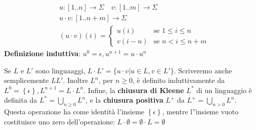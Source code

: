 \documentclass[12pt, a4paper]{report}
\begin{document}
            \begin{definition}[Concatenazione]
                \begin{equation*}
                    \begin{split}
                        &u:\left[1..n\right]\rightarrow \Sigma \quad v:\left[1..m\right]\rightarrow \Sigma\\
                        &u\cdot v:\left[1..n+m\right] \rightarrow \Sigma \\
                        &(u\cdot v)(i) = \begin{cases}
                            u(i) & \text{se } 1\leq i \leq n\\
                            v(i-n) & \text{se } n < i \leq n+m
                        \end{cases}
                    \end{split}
                \end{equation*}
                \textbf{Definizione induttiva}: $u^{0}=\epsilon,u^{n+1}=u\cdot u^{n}$
            \end{definition}
            \begin{definition}
                Se $L$ e $L'$ sono linguaaggi, $L\cdot L'=\{u\cdot v | u\in L,v\in L'\}$. Scriveremo anche semplicemente $LL'$. Inoltre $L^{n}$, per $n\geq 0$, è definito induttivamente da $L^{0}=\left\{\epsilon\right\},L^{n+1}=L\cdot L^{n}$. Infine, la \textbf{chiusura di Kleene} $L^{*}$ di un linguaggio è definita da $L^{*}=\bigcup_{n\geq 0}L^{n}$, e la \textbf{chiusura positiva} $L^{+}$ da $L^{+}=\bigcup_{n>0}L^{n}$.\\
                Questa operazione ha come identità l'insieme $\left\{\epsilon\right\}$, mentre l''insieme vuoto costituisce uno zero dell'operazione: $L\cdot\emptyset=\emptyset\cdot L=\emptyset$
            \end{definition}
\end{document}

